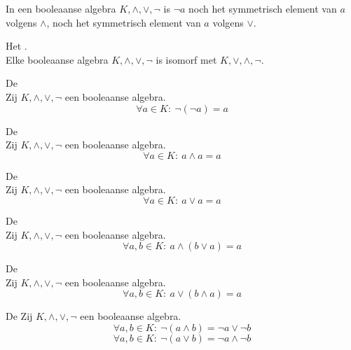 \documentclass[main.tex]{subfiles}
\begin{document}
\begin{opm}
  In een booleaanse algebra $K,\wedge,\vee,\neg$ is $\neg a$ noch het symmetrisch element van $a$ volgens $\wedge$, noch het symmetrisch element van $a$ volgens $\vee$.
\end{opm}

\begin{st}
  \label{ei:dualiteitsprincipe}
  Het .\\
  Elke booleaanse algebra $K,\wedge,\vee,\neg$ is isomorf met $K,\vee,\wedge,\neg$.
\end{st}

\begin{st}
  \label{st:involutie}
  De \\
  Zij $K,\wedge,\vee,\neg$ een booleaanse algebra.
  \[ \forall a \in K:\ \neg(\neg a) = a \]
\end{st}

\begin{st}
  \label{st:idempotentie-a-w-a}
  De \\
  Zij $K,\wedge,\vee,\neg$ een booleaanse algebra.
  \[ \forall a \in K:\ a \wedge a = a\]
\end{st}

\begin{st}
  \label{st:idempotentie-a-v-a}
  De \\
  Zij $K,\wedge,\vee,\neg$ een booleaanse algebra.
  \[ \forall a \in K:\ a \vee a = a \]
\end{st}

\begin{st}
  \label{st:absorptiewet-w-v}
  De \\
  Zij $K,\wedge,\vee,\neg$ een booleaanse algebra.
  \[ \forall a,b \in K:\ a \wedge (b \vee a) = a\]
\end{st}

\begin{st}
  \label{st:absorptiewet-v-w}
  De \\
  Zij $K,\wedge,\vee,\neg$ een booleaanse algebra.
  \[ \forall a,b \in K:\ a \vee (b \wedge a) = a\]
\end{st}

\begin{st}
  \label{st:wetten-van-de-morgan}
  De 
  Zij $K,\wedge,\vee,\neg$ een booleaanse algebra.
  \[ \forall a,b \in K:\ \neg(a \wedge b) = \neg a \vee \neg b\]
  \[ \forall a,b \in K:\ \neg(a \vee b) = \neg a \wedge \neg b\]
\end{st}
\end{document}
